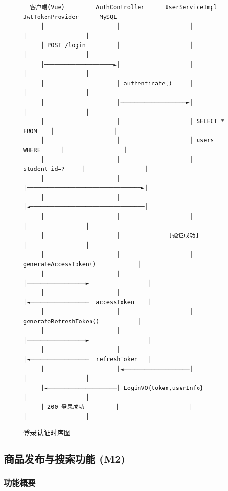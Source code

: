 \documentclass[12pt,a4paper]{ctexart}
\numberwithin{figure}{section}
\numberwithin{table}{section}
\begin{document}
\begin{figure}[H]
\centering
{\small
\begin{verbatim}
  客户端(Vue)         AuthController      UserServiceImpl    JwtTokenProvider      MySQL
     │                     │                    │                  │                 │
     │ POST /login         │                    │                  │                 │
     │────────────────────►│                    │                  │                 │
     │                     │ authenticate()     │                  │                 │
     │                     │───────────────────►│                  │                 │
     │                     │                    │ SELECT * FROM    │                 │
     │                     │                    │ users WHERE      │                 │
     │                     │                    │ student_id=?     │                 │
     │                     │                    │─────────────────────────────────►│
     │                     │                    │◄─────────────────────────────────│
     │                     │                    │                  │                 │
     │                     │              [验证成功]                 │                 │
     │                     │                    │ generateAccessToken()            │
     │                     │                    │─────────────────►│                │
     │                     │                    │◄─────────────────│ accessToken    │
     │                     │                    │ generateRefreshToken()           │
     │                     │                    │─────────────────►│                │
     │                     │                    │◄─────────────────│ refreshToken   │
     │                     │◄───────────────────│                  │                 │
     │◄────────────────────│ LoginVO{token,userInfo}              │                 │
     │ 200 登录成功         │                    │                  │                 │
\end{verbatim}
}
\caption{登录认证时序图}
\label{fig:m1-sequence}
\end{figure}

\subsection{商品发布与搜索功能 (M2)}

\subsubsection{功能概要}
\end{document}
